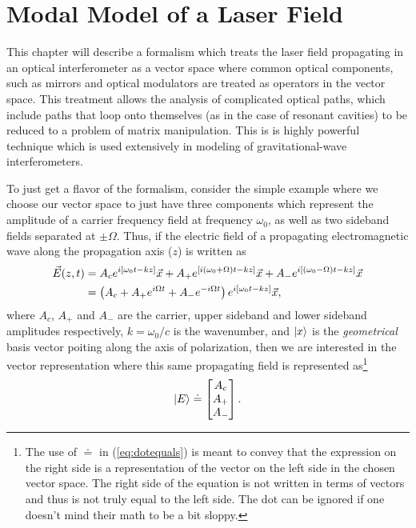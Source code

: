 

\chapter{Modal Model of a Laser Field}

This chapter will describe a formalism which treats the laser field propagating in an optical interferometer as a vector space where common optical components, such as mirrors and optical modulators are treated as operators in the vector space. %
This treatment allows the analysis of complicated optical paths, which include paths that loop onto themselves (as in the case of resonant cavities) to be reduced to a problem of matrix manipulation. %
This is is highly powerful technique which is used extensively in modeling of gravitational-wave interferometers.

To just get a flavor of the formalism, consider the simple example where we choose our vector space to just have three components which represent the amplitude of a carrier frequency field at frequency $\omega_0$, as well as two sideband fields separated at $\pm\Omega$. %
Thus, if the electric field of a propagating electromagnetic wave along the propagation axis ($z$) is written as
\begin{align*}
\vec{E}(z,t) &= A_c e^{i[\omega_0t -kz]}\vec{x} + A_+e^{[i(\omega_0+\Omega)t -kz]}\vec{x} + A_-e^{i[(\omega_0-\Omega)t -kz]}\vec{x}\\
&= \left( A_c + A_+ e^{i\Omega t}+A_-e^{-i\Omega t}\right) e^{i[\omega_0 t-kz]}\vec{x},
\end{align*}
where $A_c$, $A_+$ and $A_-$ are the carrier, upper sideband and lower sideband amplitudes respectively, $k=\omega_0/c$ is the wavenumber, and $\left| x \right>$ is the \emph{geometrical} basis vector poiting along the axis of polarization, then we are interested in the vector representation where this same propagating field is represented as\footnote{The use of $\doteq$ in (\ref{eq:dotequals}) is meant to convey that the expression on the right side is a representation of the vector on the left side in the chosen vector space. %
The right side of the equation is not written in terms of vectors and thus is not truly equal to the left side. %
The dot can be ignored if one doesn't mind their math to be a bit sloppy.} 
\begin{equation}
\label{eq:dotequals}
\left| E \right> \doteq \left[\begin{matrix} A_c \\ A_+ \\ A_- \end{matrix}\right].
\end{equation}

